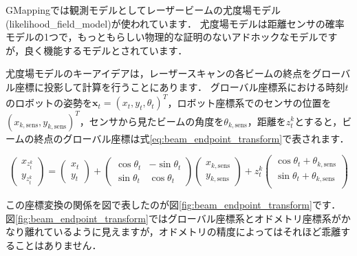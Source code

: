 \documentclass[{../../master}]{subfiles}
\begin{document}
GMappingでは観測モデルとしてレーザービームの尤度場モデル(\textsf{likelihood\_field\_model})が使われています．
尤度場モデルは距離センサの確率モデルの1つで，もっともらしい物理的な証明のないアドホックなモデルですが，良く機能するモデルとされています．

尤度場モデルのキーアイデアは，レーザースキャンの各ビームの終点をグローバル座標に投影して計算を行うことにあります．
グローバル座標系における時刻$t$のロボットの姿勢を$\bm{x}_{t} = (x_{t}, y_{t}, \theta_{t})^T$，ロボット座標系でのセンサの位置を$(x_{k, \text{sens}}, y_{k, \text{sens}})^T$，センサから見たビームの角度を$\theta_{k, \text{sens}}$，距離を$z_{t}^{k}$とすると，ビームの終点のグローバル座標は式\ref{eq:beam_endpoint_transform}で表されます．

\begin{equation}
  \begin{pmatrix}
    x_{z_{t}^{k}} \\
    y_{z_{t}^{k}}
  \end{pmatrix}
  =
  \begin{pmatrix}
    x_{t} \\
    y_{t}
  \end{pmatrix}
  +
  \begin{pmatrix}
    \cos{\theta_{t}} & -\sin{\theta_{t}} \\
    \sin{\theta_{t}} & \cos{\theta_{t}}
  \end{pmatrix}
  \begin{pmatrix}
    x_{k, \text{sens}} \\
    y_{k, \text{sens}}
  \end{pmatrix}
  + z_{t}^{k}
  \begin{pmatrix}
    \cos{\theta_{t} + \theta_{k, \text{sens}}} \\
    \sin{\theta_{t} + \theta_{k, \text{sens}}} \\
  \end{pmatrix}
  \label{eq:beam_endpoint_transform}
\end{equation}

この座標変換の関係を図で表したのが図\ref{fig:beam_endpoint_transform}です．
図\ref{fig:beam_endpoint_transform}ではグローバル座標系とオドメトリ座標系がかなり離れているように見えますが，オドメトリの精度によってはそれほど乖離することはありません．
\end{document}
